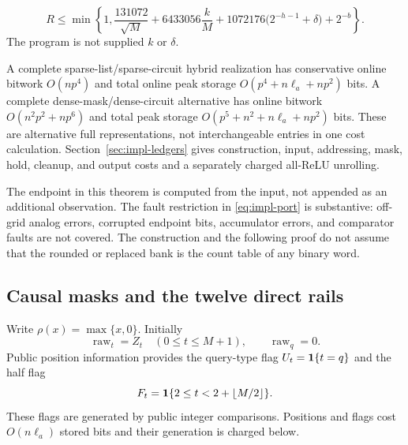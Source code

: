 \begin{theorem}
\begin{enumerate}
 \begin{equation}\label{eq:impl-risk}
 R\le\min\left\{1,\frac{131072}{\sqrt M}
       +6433056\frac{k}{M}
       +1072176\bigl(2^{-h-1}+\delta\bigr)+2^{-b}\right\}.
 \end{equation}
 The program is not supplied $k$ or $\delta$.
\end{enumerate}
A complete sparse-list/sparse-circuit hybrid realization has conservative
online bitwork $O(np^4)$ and total online peak storage
$O(p^4+n\ell_a+np^2)$ bits. A complete dense-mask/dense-circuit alternative
has online bitwork $O(n^2p^2+np^6)$ and total peak storage
$O(p^5+n^2+n\ell_a+np^2)$ bits. These are alternative full
representations, not interchangeable entries in one cost calculation.
Section~\ref{sec:impl-ledgers} gives construction, input, addressing,
mask, hold, cleanup, and output costs and a separately charged all-ReLU
unrolling.
\end{theorem}

The endpoint in this theorem is computed from the input, not appended as
an additional observation. The fault restriction in
\eqref{eq:impl-port} is substantive: off-grid analog errors, corrupted
endpoint bits, accumulator errors, and comparator faults are not covered.
The construction and the following proof do not assume that the rounded
or replaced bank is the count table of any binary word.

\subsection{Causal masks and the twelve direct rails}\label{sec:impl-prefix}

Write $\rho(x)=\max\{x,0\}$. Initially
\[
 \operatorname{raw}_t=Z_t\quad(0\le t\le M+1),\qquad
 \operatorname{raw}_q=0.
\]
Public position information provides the query-type flag
$U_t=\mathbf 1\{t=q\}$ and the half flag
\begin{equation}\label{eq:impl-half-flag}
 F_t=\mathbf 1\{2\le t<2+\lfloor M/2\rfloor\}.
\end{equation}
These flags are generated by public integer comparisons. Positions and
flags cost $O(n\ell_a)$ stored bits and their generation is charged below.

